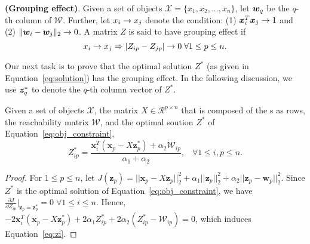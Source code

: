 
\begin{definition}
\label{def:grouping}
\textbf{(Grouping effect)}. 
Given a set of objects $\mathcal{X} = \{x_1, x_2,..., x_n\}$,
let ${\bm w}_q$ be the $q$-th column of $\mathcal{W}$. 
Further, let $x_{i} \rightarrow x_{j}$ denote the condition:
(1) $\bm{x}_i^T \bm{x}_j \rightarrow 1$ and 
(2) $\lVert {\bm w}_i - {\bm w}_j \rVert_2 \rightarrow 0$.
A matrix $Z$ is said to have grouping effect
if
\[
x_{i} \rightarrow x_{j} \Rightarrow |Z_{ip} - Z_{jp}| \rightarrow 0\; \forall 1 \leq p \leq n.
\]
\end{definition}

Our next task is to prove that the optimal solution $Z^*$ (as given in Equation~\ref{eq:solution})
has the grouping effect.
In the following discussion, we use ${\bm z}_q^*$ to denote the $q$-th column vector of $Z^*$.

\begin{lemma}
\label{lemma1}
Given a set of objects $\mathcal{X}$,
the matrix
$X\in \mathcal{R}^{p\times n}$ that is composed of the {\pev}s as rows,
 the reachability matrix $\mathcal{W}$,
 and the optimal soution $Z^*$ of Equation~\ref{eq:obj_constraint},
\begin{equation}
\label{eq:zi}
Z_{ip}^* = \frac{\bm{x}_i^T(\bm{x}_p-X\bm{z}_p^*) + \alpha_2 \mathcal{W}_{ip}}{\alpha_1+\alpha_2}, \;\;\; \forall 1 \leq i, p \leq n.
\end{equation}
\end{lemma}

\begin{proof}
For $1 \leq p \leq n$,
let $J(\bm{z}_p) =  ||\bm{x}_p-X\bm{z}_p||_2^2 + \alpha_1 ||\bm{z}_p||_2^2 + \alpha_2 ||\bm{z}_p-\bm{w}_p||_2^2$.
Since $Z^*$ is the optimal solution of Equation~\ref{eq:obj_constraint}, we have $\frac{\partial{J}}{\partial{Z}_{ip}}|_{\bm{z}_p = \bm{z}_p^*} = 0\; \forall 1\leq i \leq n$.
Hence, $-2\bm{x}_i^T(\bm{x}_p-X\bm{z}_p^*)+2\alpha_1Z_{ip}^*+2\alpha_2(Z_{ip}^*-\mathcal{W}_{ip}) = 0$,
which induces Equation~\ref{eq:zi}.
\end{proof}

